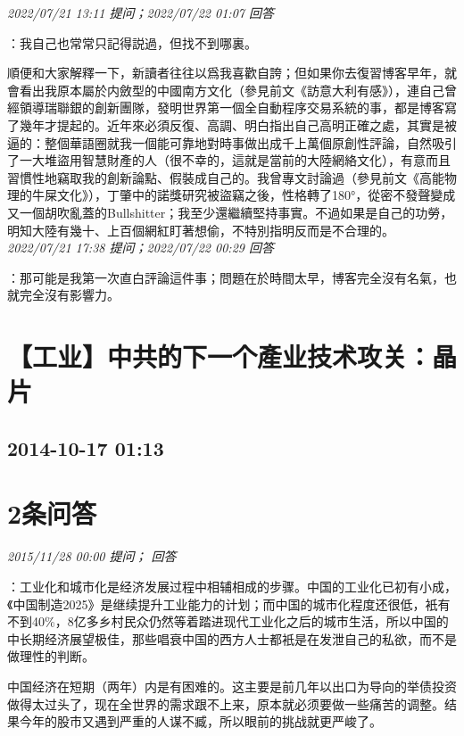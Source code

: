 \documentclass[twocolumn]{ctexart}
\begin{document}
\textit{\hfill\noindent\small 2022/07/21 13:11 提问；2022/07/22 01:07 回答}

：我自己也常常只記得説過，但找不到哪裏。

順便和大家解釋一下，新讀者往往以爲我喜歡自誇；但如果你去復習博客早年，就會看出我原本屬於内斂型的中國南方文化（參見前文《訪意大利有感》），連自己曾經領導瑞聯銀的創新團隊，發明世界第一個全自動程序交易系統的事，都是博客寫了幾年才提起的。近年來必須反復、高調、明白指出自己高明正確之處，其實是被逼的：整個華語圈就我一個能可靠地對時事做出成千上萬個原創性評論，自然吸引了一大堆盜用智慧財產的人（很不幸的，這就是當前的大陸網絡文化），有意而且習慣性地竊取我的創新論點、假裝成自己的。我曾專文討論過（參見前文《高能物理的牛屎文化》），丁肇中的諾獎研究被盜竊之後，性格轉了180°，從密不發聲變成又一個胡吹亂蓋的Bullshitter；我至少還繼續堅持事實。不過如果是自己的功勞，明知大陸有幾十、上百個網紅盯著想偷，不特別指明反而是不合理的。
\\

\textit{\hfill\noindent\small 2022/07/21 17:38 提问；2022/07/22 00:29 回答}

：那可能是我第一次直白評論這件事；問題在於時間太早，博客完全沒有名氣，也就完全沒有影響力。
\\


\section{【工业】中共的下一个產业技术攻关：晶片}
\subsection{2014-10-17 01:13}


\section{2条问答}

\textit{\hfill\noindent\small 2015/11/28 00:00 提问； 回答}

：工业化和城市化是经济发展过程中相辅相成的步骤。中国的工业化已初有小成，《中国制造2025》是继续提升工业能力的计划；而中国的城市化程度还很低，衹有不到40\%，8亿多乡村民众仍然等着踏进现代工业化之后的城市生活，所以中国的中长期经济展望极佳，那些唱衰中国的西方人士都衹是在发泄自己的私欲，而不是做理性的判断。

中国经济在短期（两年）内是有困难的。这主要是前几年以出口为导向的举债投资做得太过头了，现在全世界的需求跟不上来，原本就必须要做一些痛苦的调整。结果今年的股市又遇到严重的人谋不臧，所以眼前的挑战就更严峻了。
\end{document}
